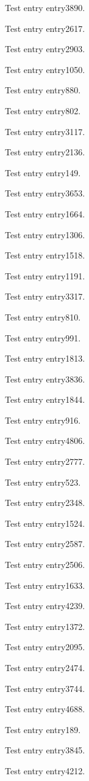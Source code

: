 Test entry \gls{entry3890}.

Test entry \gls{entry2617}.

Test entry \gls{entry2903}.

Test entry \gls{entry1050}.

Test entry \gls{entry880}.

Test entry \gls{entry802}.

Test entry \gls{entry3117}.

Test entry \gls{entry2136}.

Test entry \gls{entry149}.

Test entry \gls{entry3653}.

Test entry \gls{entry1664}.

Test entry \gls{entry1306}.

Test entry \gls{entry1518}.

Test entry \gls{entry1191}.

Test entry \gls{entry3317}.

Test entry \gls{entry810}.

Test entry \gls{entry991}.

Test entry \gls{entry1813}.

Test entry \gls{entry3836}.

Test entry \gls{entry1844}.

Test entry \gls{entry916}.

Test entry \gls{entry4806}.

Test entry \gls{entry2777}.

Test entry \gls{entry523}.

Test entry \gls{entry2348}.

Test entry \gls{entry1524}.

Test entry \gls{entry2587}.

Test entry \gls{entry2506}.

Test entry \gls{entry1633}.

Test entry \gls{entry4239}.

Test entry \gls{entry1372}.

Test entry \gls{entry2095}.

Test entry \gls{entry2474}.

Test entry \gls{entry3744}.

Test entry \gls{entry4688}.

Test entry \gls{entry189}.

Test entry \gls{entry3845}.

Test entry \gls{entry4212}.

